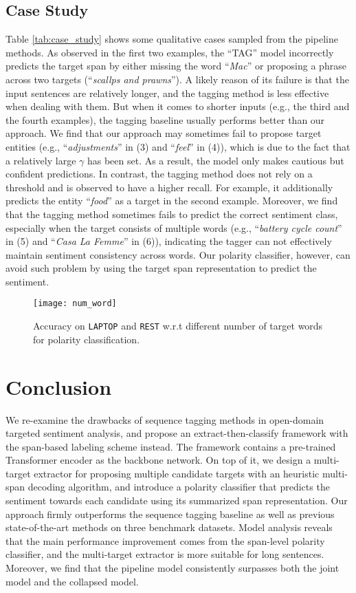 \documentclass[11pt,a4paper]{article}
\begin{document}
\subsection{Case Study}
Table \ref{tab:case_study} shows some qualitative cases sampled from the pipeline methods.
As observed in the first two examples, the ``TAG'' model incorrectly predicts the target span by either missing the word ``\emph{Mac}'' or proposing a phrase across two targets (``\emph{scallps and prawns}'').
A likely reason of its failure is that the input sentences are relatively longer, and the tagging method is less effective when dealing with them.
But when it comes to shorter inputs (e.g., the third and the fourth examples), the tagging baseline usually performs better than our approach.
We find that our approach may sometimes fail to propose target entities (e.g., ``\emph{adjustments}'' in (3) and ``\emph{feel}'' in (4)), which is due to the fact that a relatively large $\gamma$ has been set.
As a result, the model only makes cautious but confident predictions.
In contrast, the tagging method does not rely on a threshold and is observed to have a higher recall.
For example, it additionally predicts the entity ``\emph{food}'' as a target in the second example.
Moreover, we find that the tagging method sometimes fails to predict the correct sentiment class, especially when the target consists of multiple words (e.g., ``\emph{battery cycle count}'' in (5) and ``\emph{Casa La Femme}'' in (6)), indicating the tagger can not effectively maintain sentiment consistency across words.
Our polarity classifier, however, can avoid such problem by using the target span representation to predict the sentiment.

\begin{figure}
\center
\texttt{[image: num\_word]}
\caption{Accuracy on \texttt{LAPTOP} and \texttt{REST} w.r.t different number of target words for polarity classification.}
\label{fig:num_word}
\end{figure} \section{Conclusion}
We re-examine the drawbacks of sequence tagging methods in open-domain targeted sentiment analysis, and propose an extract-then-classify framework with the span-based labeling scheme instead.
The framework contains a pre-trained Transformer encoder as the backbone network.
On top of it, we design a multi-target extractor for proposing multiple candidate targets with an heuristic multi-span decoding algorithm, and introduce a polarity classifier that predicts the sentiment towards each candidate using its summarized span representation.
Our approach firmly outperforms the sequence tagging baseline as well as previous state-of-the-art methods on three benchmark datasets.
Model analysis reveals that the main performance improvement comes from the span-level polarity classifier, and the multi-target extractor is more suitable for long sentences.
Moreover, we find that the pipeline model consistently surpasses both the joint model and the collapsed model.
\end{document}
